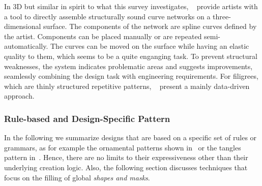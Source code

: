 In 3D but similar in spirit to what this survey investigates, \citeauthor*{zehnder_2016_dso}~\cite{zehnder_2016_dso} provide artists with a tool to directly assemble structurally sound curve networks on a three-dimensional surface. The components of the network are spline curves defined by the artist. Components can be placed manually or are repeated semi-automatically. The curves can be moved on the surface while having an elastic quality to them, which seems to be a quite enganging task. To prevent structural weaknesses, the system indicates problematic areas and suggests improvements, seamlessly combining the design task with engineering requirements. For filigrees, which are thinly structured repetitive patterns, \citeauthor*{chen_2016_sof}~\cite{chen_2016_sof} present a mainly data-driven approach. 




\subsubsection{Rule-based and Design-Specific Pattern}
\label{subsubsec:analysis_rulebased_and_designspecific}

In the following we summarize designs that are based on a specific set of rules or grammars, as for example the ornamental patterns shown in~ or the tangles pattern in~. Hence, there are no limits to their expressiveness other than their underlying creation logic. Also, the following section discusses techniques that focus on the filling of global \textit{shapes and masks}.

